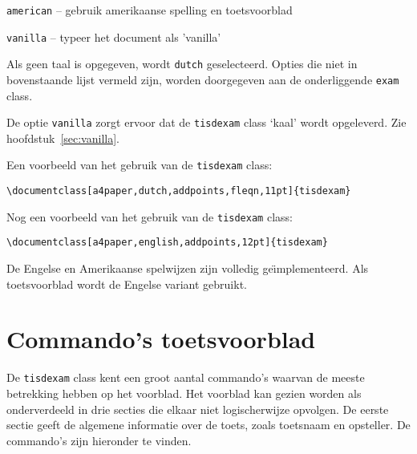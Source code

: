 \documentclass[12pt,dutch,addpoints,fleqn]{tisdexam}
\newcommand\DocClass[1]{\texttt{#1}}
\newcommand\Option[1]{\texttt{#1}}
\begin{document}
\Option{american} -- gebruik amerikaanse spelling en toetsvoorblad

\Option{vanilla} -- typeer het document als 'vanilla'


\bigskip
Als geen taal is opgegeven, wordt \Option{dutch} geselecteerd.
Opties die niet in bovenstaande lijst vermeld zijn, worden doorgegeven aan
de onderliggende \DocClass{exam} class.


\medskip
De optie \Option{vanilla} zorgt ervoor dat de \DocClass{tisdexam} class `kaal'
wordt opgeleverd. Zie hoofdstuk~\ref{sec:vanilla}.

\bigskip
Een voorbeeld van het gebruik van de \DocClass{tisdexam} class:
\bigskip

\verb|\documentclass[a4paper,dutch,addpoints,fleqn,11pt]{tisdexam}|
\bigskip

Nog een voorbeeld van het gebruik van de \DocClass{tisdexam} class:
\bigskip

\verb|\documentclass[a4paper,english,addpoints,12pt]{tisdexam}|
\bigskip

De Engelse en Amerikaanse spelwijzen zijn volledig
ge\"{\i}mplementeerd. Als toetsvoorblad wordt de Engelse variant gebruikt.


\section{Commando's toetsvoorblad}
\label{sec:commands}

De \DocClass{tisdexam} class kent een groot aantal commando's waarvan de meeste
betrekking hebben op het voorblad.  Het voorblad kan gezien worden als onderverdeeld
in drie secties die elkaar niet logischerwijze opvolgen. De eerste sectie geeft de
algemene informatie over de toets, zoals
toetsnaam en opsteller. De commando's zijn hieronder te vinden.
\bigskip
\end{document}
